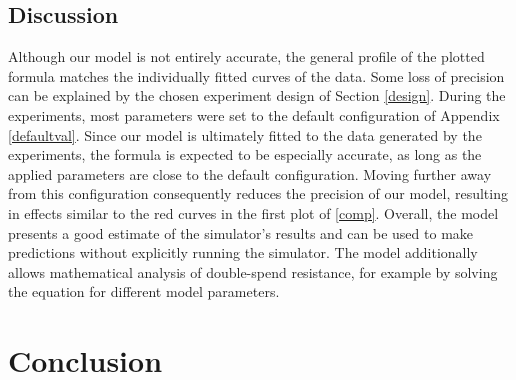 \documentclass[a4paper,12pt,twoside]{report}
\begin{document}
\section{Discussion} \label{modeldisc}
Although our model is not entirely accurate, the general profile of the plotted formula matches the individually fitted curves of the data. Some loss of precision can be explained by the chosen experiment design of Section \ref{design}. During the experiments, most parameters were set to the default configuration of Appendix \ref{defaultval}. Since our model is ultimately fitted to the data generated by the experiments, the formula is expected to be especially accurate, as long as the applied parameters are close to the default configuration. Moving further away from this configuration consequently reduces the precision of our model, resulting in effects similar to the red curves in the first plot of \autoref{comp}. Overall, the model presents a good estimate of the simulator's results and can be used to make predictions without explicitly running the simulator. The model additionally allows mathematical analysis of double-spend resistance, for example by solving the equation for different model parameters.

\chapter{Conclusion} \label{conclusion}
\end{document}
